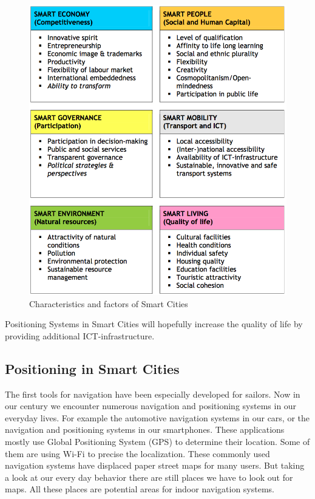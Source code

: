 \begin{figure}[h]
	\centering
		\includegraphics[width=.9\textwidth]{images/characteristics.png}
	\caption{Characteristics and factors of Smart Cities \parencite{smartCharacter}}
	\label{fig:characteristics}
\end{figure}

Positioning Systems in Smart Cities will hopefully increase the quality of life by providing additional ICT-infrastructure. 

\subsection{Positioning in Smart Cities}\label{posInCS}
The first tools for navigation have been especially developed for sailors. Now in our century we encounter numerous navigation and positioning systems in our everyday lives. For example the automotive navigation systems in our cars, or the navigation and positioning systems in our smartphones. These applications mostly use Global Positioning System (GPS) to determine their location. Some of them are using Wi-Fi to precise the localization. These commonly used navigation systems have displaced paper street maps for many users. But taking a look at our every day behavior there are still places we have to look out for maps. All these places are potential areas for indoor navigation systems. 

